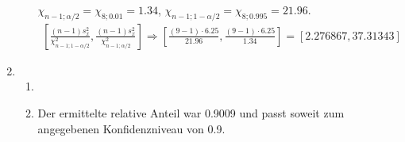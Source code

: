 \documentclass[a4paper]{scrartcl}
\def \blattnr {8}
\begin{document}
\begin{enumerate}[label=\bfseries \blattnr.\arabic*]
\begin{enumerate}
  $\chi_{n-1;\alpha/2} = \chi_{8;0.01} = 1.34$, $\chi_{n-1;1-\alpha/2} = \chi_{8;0.995} = 21.96$.
  \begin{equation*}
    \begin{split}
      \left[ \frac{(n-1)s_x^2}{\chi^2_{n-1;1-\alpha /2}} \right.,\left. \frac{(n-1)s_x^2}{\chi^2_{n-1;\alpha /2}} \right] 
      \Rightarrow \left[ \frac{(9-1) \cdot 6.25}{21.96} \right.,\left. \frac{(9-1) \cdot 6.25}{1.34} \right] 
      = [2.276867 , 37.31343]
    \end{split}
  \end{equation*}
\end{enumerate}

\item 
\pagebreak
\begin{enumerate}
 \item 
    
 \item 
    Der ermittelte relative Anteil war 0.9009 und passt soweit zum angegebenen Konfidenzniveau von 0.9.
\end{enumerate}

\end{enumerate}
\end{document}
